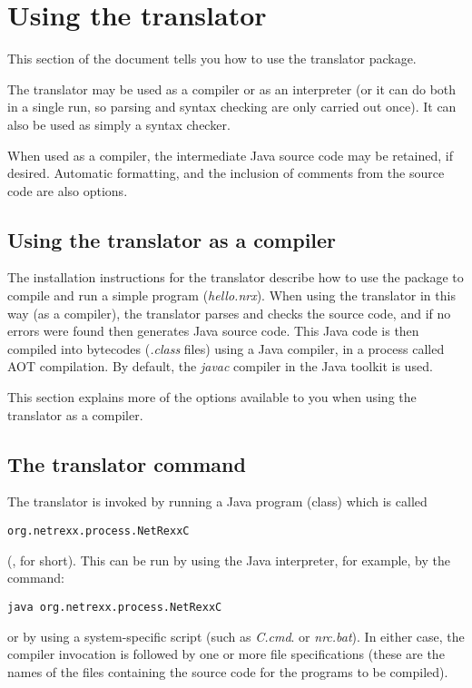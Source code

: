 

\chapter{Using the translator}
This section of the document tells you how to use the
translator package.

The \nr{} translator may be used as a compiler or as an interpreter
(or it can do both in a single run, so parsing and syntax checking are
only carried out once).  It can also be used as simply a syntax checker.

When used as a compiler, the intermediate Java source code may be
retained, if desired.  Automatic formatting, and the inclusion of comments
from the \nr{} source code are also options.

\section{Using the translator as a compiler}
The installation instructions for the \nr{} translator describe how to
use the package to compile and run a simple \nr{} program
(\emph{hello.nrx}).  When using the translator in this way (as a
compiler), the translator parses and checks the \nr{} source code, and
if no errors were found then generates Java source code.  This Java
code is then compiled into bytecodes
(\emph{.class} files) using a Java compiler, in a process called AOT
compilation. By default,
the \emph{javac} compiler in the Java toolkit is used.

This section explains more of the options available to you when using
the translator as a compiler.
\section{The translator command}

The translator is invoked by running a Java program (class) which is
called 
\begin{lstlisting}
org.netrexx.process.NetRexxC
\end{lstlisting}  
(, for short). This can be run by using the Java interpreter, for example,
by the command:
\begin{lstlisting}
java org.netrexx.process.NetRexxC
\end{lstlisting}
or by using a system-specific script (such as \emph{\nr{}C.cmd}.
or \emph{nrc.bat}).  In either case, the compiler invocation is followed
by one or more file specifications (these are the names of the files
containing the \nr{} source code for the programs to be compiled).

